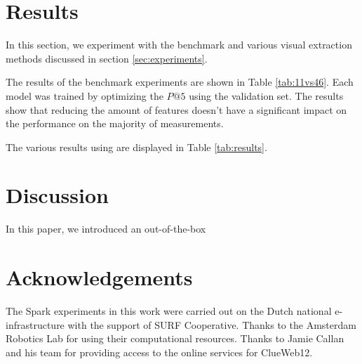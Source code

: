 \section{Results}
In this section, we experiment with the benchmark and various visual extraction methods discussed in section \ref{sec:experiments}. 

The results of the benchmark experiments are shown in Table \ref{tab:11vs46}. Each model was trained by optimizing the $P@5$ using the validation set. The results show that reducing the amount of features doesn't have a significant impact on the performance on the majority of measurements. 

The various results using \datasetname are displayed in Table \ref{tab:results}. 




\section{Discussion}
In this paper, we introduced an out-of-the-box 

\section{Acknowledgements}
The Spark experiments in this work were carried out on the Dutch national e-infrastructure with the support of SURF Cooperative. Thanks to the Amsterdam Robotics Lab for using their computational resources. Thanks to Jamie Callan and his team for providing access to the online services for ClueWeb12. 
